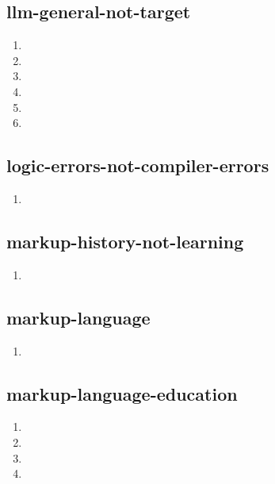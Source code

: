 \documentclass{article}
\begin{document}
\subsection{llm-general-not-target}
\begin{enumerate}
\item {}
\item {}
\item {}
\item {}
\item {}
\item {}
\end{enumerate}

\subsection{logic-errors-not-compiler-errors}
\begin{enumerate}
\item {}
\end{enumerate}

\subsection{markup-history-not-learning}
\begin{enumerate}
\item {}
\end{enumerate}

\subsection{markup-language}
\begin{enumerate}
\item {}
\end{enumerate}

\subsection{markup-language-education}
\begin{enumerate}
\item {}
\item {}
\item {}
\item {}
\end{enumerate}
\end{document}
